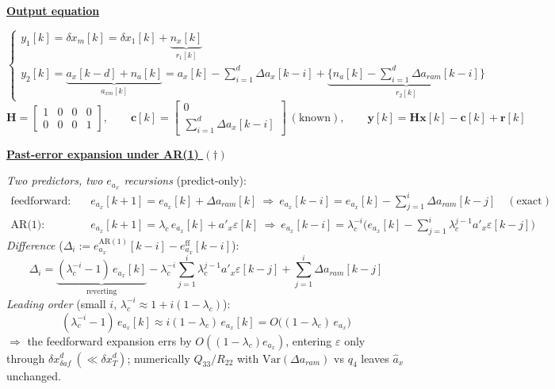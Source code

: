\documentclass[11pt,a4paper,fontset=none]{ctexart}
\newcommand{\lc}{\lambda_c}
\newcommand{\hd}[1]{\par\medskip\noindent\underline{\textbf{#1}}\par\nobreak\vspace{0.2ex}}
\begin{document}
\hd{Output equation}
\[
\begin{cases}
y_1[k] = \delta x_m[k] = \delta x_1[k] + \underbrace{n_x[k]}_{r_1[k]} \\[1.8ex]
y_2[k] = \underbrace{a_x[k-d] + n_a[k]}_{a_{xm}[k]} = a_x[k] - \textstyle\sum_{i=1}^{d}\Delta a_x[k-i] + \underbrace{\Big\{ n_a[k] - \textstyle\sum_{i=1}^{d}\Delta a_{ram}[k-i] \Big\}}_{r_2[k]}
\end{cases}
\]
\[
\mathbf{H} = \begin{bmatrix} 1 & 0 & 0 & 0 \\ 0 & 0 & 0 & 1 \end{bmatrix},
\qquad
\mathbf{c}[k] = \begin{bmatrix} 0 \\ \textstyle\sum_{i=1}^{d}\Delta a_x[k-i] \end{bmatrix}\ (\text{known}),
\qquad
\mathbf{y}[k] = \mathbf{H}\mathbf{x}[k] - \mathbf{c}[k] + \mathbf{r}[k]
\]

\newpage
\hd{Past-error expansion under AR(1) $(\dagger)$}
\textit{Two predictors, two $e_{a_x}$ recursions} (predict-only):
\[
\begin{aligned}
\text{feedforward:}\quad & e_{a_x}[k+1] = e_{a_x}[k] + \Delta a_{ram}[k]
   \ \Rightarrow\ e_{a_x}[k-i] = e_{a_x}[k] - \textstyle\sum_{j=1}^{i}\Delta a_{ram}[k-j] \quad(\text{exact}) \\
\text{AR(1):}\quad & e_{a_x}[k+1] = \lc\, e_{a_x}[k] + a'_x\varepsilon[k]
   \ \Rightarrow\ e_{a_x}[k-i] = \lc^{-i}\big(e_{a_x}[k] - \textstyle\sum_{j=1}^{i}\lc^{j-1}a'_x\varepsilon[k-j]\big)
\end{aligned}
\]
\textit{Difference} ($\Delta_i := e_{a_x}^{\mathrm{AR(1)}}[k-i] - e_{a_x}^{\mathrm{ff}}[k-i]$):
\[ \Delta_i = \underbrace{(\lc^{-i}-1)\,e_{a_x}[k]}_{\text{reverting}}
   - \lc^{-i}\sum_{j=1}^{i}\lc^{j-1}a'_x\varepsilon[k-j]
   + \sum_{j=1}^{i}\Delta a_{ram}[k-j] \]
\textit{Leading order} (small $i$, $\lc^{-i} \approx 1 + i(1-\lc)$):
\[ (\lc^{-i}-1)\,e_{a_x}[k] \approx i(1-\lc)\,e_{a_x}[k] = O\big((1-\lc)\,e_{a_x}\big) \]
$\Rightarrow$ the feedforward expansion errs by $O((1-\lc)e_{a_x})$, entering $\varepsilon$ only through $\delta x_{\delta af}^{d}\ (\ll \delta x_T^{d})$; numerically $Q_{33}/R_{22}$ with $\mathrm{Var}(\Delta a_{ram})$ vs $q_4$ leaves $\hat a_x$ unchanged.
\end{document}

